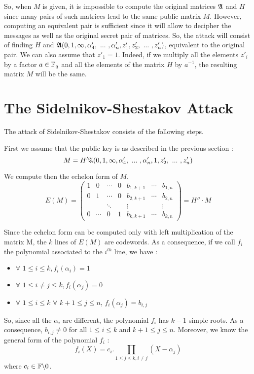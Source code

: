 \documentclass[12pt,a4paper,titlepage]{article}
\begin{document}
So, when $M$ is given, it is impossible to compute the original matrices $\mathfrak{A}$ and $H$ since many pairs of such matrices lead to the same public matrix $M$. However, computing an equivalent pair is sufficient
since it will allow to decipher the messages as well as the original secret pair of matrices. So, the attack will consist of finding $H$ and $\mathfrak{A}(0, 1, \infty, \alpha'_4, \ ... \ , \alpha'_n, z'_1, z'_2, \ ... \ , z'_n)$, equivalent to the original pair. 
We can also assume that $z'_1=1$. Indeed, if we multiply all the elements $z'_i$ by a factor $a \in \mathbb{F}_q$ and all the elements of the matrix $H$ by $a^{-1}$, the resulting matrix $M$ will be the same.


\newpage
\section{The Sidelnikov-Shestakov Attack}
\label{sec:SSattack}

The attack of Sidelnikov-Shestakov consists of the following steps.
\bigskip

First we assume that the public key is as described in the previous section :
$$ M = H' \mathfrak{A}(0, 1, \infty, \alpha'_4, \ ... \ , \alpha'_n, 1, z'_2, \ ... \ , z'_n) $$

We compute then the echelon form of $M$.
$$ E(M) = 
\left(
\begin{array}{ccccccc}
1 & 0 & \cdots & 0 & b_{1,k+1} & \cdots & b_{1,n} \\
0 & 1 & \cdots & 0 & b_{2,k+1} & \cdots & b_{2,n} \\
  &   & \ddots &   & \vdots &   & \vdots \\
0 & \cdots & 0 & 1 & b_{k,k+1} & \cdots & b_{k,n}
\end{array}
\right) = H'' \cdot M
$$

Since the echelon form can be computed only with left multiplication of the matrix M, the $k$ lines of $E(M)$ are codewords. As a consequence, if we call $f_i$ the polynomial associated to the $i^{th}$
line, we have :
\begin{itemize}
\item $\forall$  $1\leq i\leq k, f_i(\alpha_i)=1 $
\item $\forall$  $1\leq i\neq j\leq k, f_i(\alpha_j)=0 $
\item $\forall$  $1\leq i\leq k$ $\forall$ $k+1\leq j\leq n$, $f_i(\alpha_j)=b_{i,j} $
\end{itemize}
So, since all the $\alpha_i$ are different, the polynomial $f_i$ has $k-1$ simple roots. As a consequence, $b_{i,j}\neq0$ for all $1\leq i\leq k$ and $k+1\leq j\leq n$. Moreover, we know the general 
form of the polynomial $f_i$ :
$$f_i(X) = c_i.\prod_{1\leq j\leq k, i\neq j} (X-\alpha_j)$$ where $c_i \in \mathbb{F}\backslash{0}$.
\end{document}
